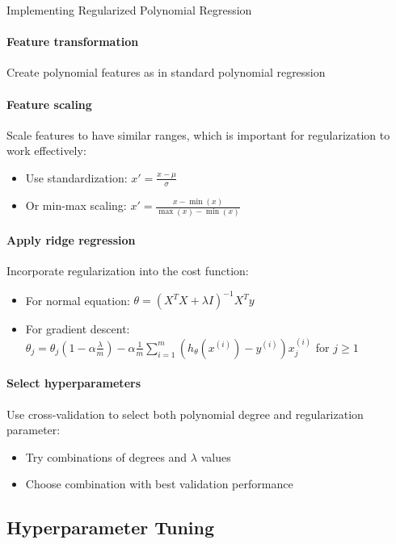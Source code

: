\begin{KR}{Implementing Regularized Polynomial Regression}\\
\paragraph{Feature transformation}
Create polynomial features as in standard polynomial regression

\paragraph{Feature scaling}
Scale features to have similar ranges, which is important for regularization to work effectively:
\begin{itemize}
    \item Use standardization: $x' = \frac{x - \mu}{\sigma}$
    \item Or min-max scaling: $x' = \frac{x - \min(x)}{\max(x) - \min(x)}$
\end{itemize}

\paragraph{Apply ridge regression}
Incorporate regularization into the cost function:
\begin{itemize}
    \item For normal equation: $\theta = (X^T X + \lambda I)^{-1}X^T y$
    \item For gradient descent: $\theta_j = \theta_j(1-\alpha\frac{\lambda}{m}) - \alpha\frac{1}{m}\sum_{i=1}^{m}(h_\theta(x^{(i)}) - y^{(i)})x^{(i)}_j$ for $j \geq 1$
\end{itemize}

\paragraph{Select hyperparameters}
Use cross-validation to select both polynomial degree and regularization parameter:
\begin{itemize}
    \item Try combinations of degrees and $\lambda$ values
    \item Choose combination with best validation performance
\end{itemize}
\end{KR}

\subsection{Hyperparameter Tuning}

